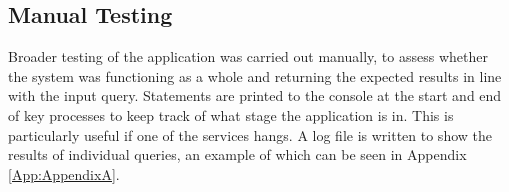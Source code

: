 \documentclass[Report.tex]{subfiles}
\begin{document}
\subsection{Manual Testing}
Broader testing of the application was carried out manually, to assess whether the system was functioning as a whole and returning the expected results in line with the input query. Statements are printed to the console at the start and end of key processes to keep track of what stage the application is in. This is particularly useful if one of the services hangs. A log file is written to show the results of individual queries, an example of which can be seen in Appendix \ref{App:AppendixA}. 
\end{document}
